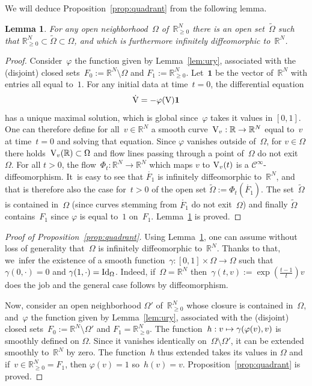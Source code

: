 \documentclass[JEP,XML,SOM,Unicode,published]{cedram}
\newcommand\mto{\mathchoice{\longmapsto}{\mapsto}{\mapsto}{\mapsto}}
\newtheorem{lem}[prop]{Lemma}
\theoremstyle{definition}
\newcommand\R{\mathbb{R}}
\let\ffi\varphi
\begin{document}
We will deduce Proposition~\ref{prop:quadrant} from the following lemma.
\begin{lem}\label{lem:ouv}
For any open neighborhood~$\Omega$ of~$\R_{\geq 0}^N$ there is an open set~$\widetilde \Omega$ such that ${\R_{\geq 0}^N}\subset\widetilde{\Omega}\subset\Omega$, and which is furthermore infinitely diffeomorphic to~$\R^N$.
\end{lem}
\begin{proof}
Consider~$\ffi$ the function given by Lemma~\ref{lem:ury}, associated with the (disjoint) closed sets~$F_0:=\R^N\setminus \Omega$ and $F_1:=\R_{\geq 0}^N$. Let~$\mathbf{1}$ be the vector of~$\R^N$ with entries all equal to~$1$. For any initial data at time~$t=0$, the differential equation
\[
\dot{\textnormal{V}} = -\ffi(\textnormal{V})\mathbf{1}
\]
has a unique maximal solution, which is global since~$\ffi$ takes it values in $[0,1]$. One can
therefore define for all~$v\in \R^N$ a smooth curve~$\textnormal{V}_v:\R\to\R^N$ equal to~$v$ at time~$t=0$ and solving that equation. Since $\ffi$ vanishes outside of~$\Omega$, for $v \in \Omega$ there holds~$\textnormal{V}_v(\R)\subset \Omega$ and flow lines passing through a point of~$\Omega$ do not exit~$\Omega$. For all $t>0$, the flow~$\Phi_t: \R^N\to\R^N$ which maps $v$ to $\textnormal{V}_v(t)$ is a $\mathscr{C}^\infty$-diffeomorphism. It~is easy to see that $\mathring{F_1}$ is infinitely diffeomorphic to~$\R^N$, and that is therefore also the case for~$t>0$ of the open set $ \widetilde \Omega:=\Phi_t(\mathring{F_1})$. The set~$ \widetilde \Omega$ is contained in~$\Omega$ (since curves stemming from $\mathring{F_1}$ do not exit~$\Omega$) and finally $ \widetilde \Omega$ contains~$F_1$ since $\ffi$ is equal to~$1$ on~$F_1$. Lemma~\ref{lem:ouv} is proved.
\end{proof}

\begin{proof}[Proof of Proposition~\ref{prop:quadrant}]
Using Lemma~\ref{lem:ouv}, one can assume without loss of generality that~$\Omega $ is infinitely diffeomorphic to~$\R^N$. Thanks to that, we~infer the existence of a smooth function~$\gamma:[0,1]\times \Omega \to \Omega$ such that $\gamma(0,\cdot)=0$ and $\gamma(1,\cdot) = \textnormal{Id}_ \Omega$. Indeed, if~$\Omega=\R^N$ then~$\gamma(t,v):= \exp\left(\frac{t-1}{t}\right)v$ does the job and the general case follows by diffeomorphism.

Now, consider an open neighborhood $\Omega'$ of~$\R_{\geq 0}^N$ whose closure is contained in~$\Omega$, and~$\ffi$ the function given by Lemma~\ref{lem:ury}, associated with the (disjoint) closed sets~$F_0:=\R^N\setminus \Omega'$ and $F_1=\R_{\geq 0}^N$. The function~$h:v \mto \gamma(\ffi(v),v)$ is smoothly defined on $\Omega$. Since it vanishes identically on~$\Omega\setminus \Omega'$, it can be extended smoothly to~$\R^N$ by zero. The function~$h$ thus extended takes its values in $\Omega$ and if~$v\in \R_{\geq 0}^N=F_1$, then $\ffi(v)=1$ so~$h(v)=v$. Proposition~\ref{prop:quadrant} is proved.
\end{proof}




\end{document}
